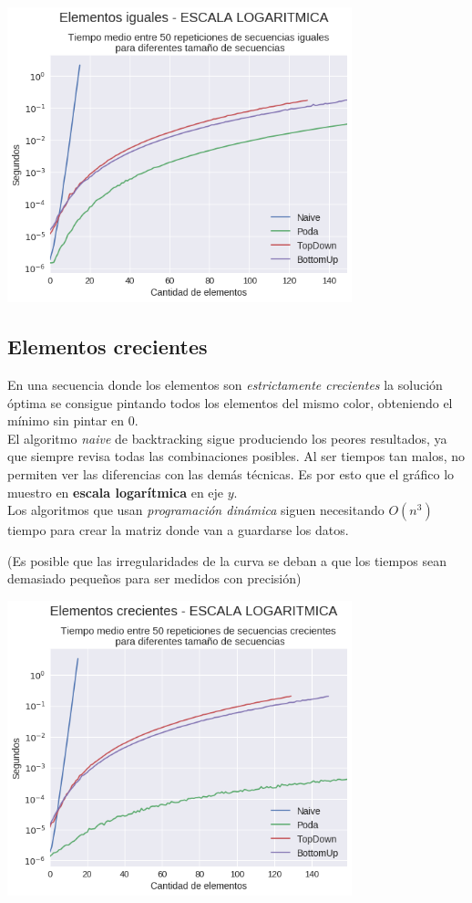 {\centering
  \includegraphics[width=0.75\textwidth]{informe/img/experimentos/todos-iguales-logaritmica.png} \\
}

\subsection{Elementos crecientes}

En una secuencia donde los elementos son \textit{estrictamente crecientes} la solución óptima se consigue pintando todos los elementos del mismo color, obteniendo el mínimo sin pintar en 0. \\

El algoritmo \textit{naive} de backtracking sigue produciendo los peores resultados, ya que siempre revisa todas las combinaciones posibles. Al ser tiempos tan malos, no permiten ver las diferencias con las demás técnicas. Es por esto que el gráfico lo muestro en \textbf{escala logarítmica} en eje $y$.\\

Los algoritmos que usan \textit{programación dinámica} siguen necesitando $O(n^3)$ tiempo para crear la matriz donde van a guardarse los datos. 

(Es posible que las irregularidades de la curva se deban a que los tiempos sean demasiado pequeños para ser medidos con precisión)

{\centering
  \includegraphics[width=0.75\textwidth]{informe/img/experimentos/todos-creciente-logaritmica.png} \\
}
